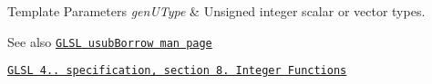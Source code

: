 \begin{DoxyTemplParams}{Template Parameters}
{\em gen\+U\+Type} & Unsigned integer scalar or vector types.\\
\hline
\end{DoxyTemplParams}
\begin{DoxySeeAlso}{See also}
\href{http://www.opengl.org/sdk/docs/manglsl/xhtml/usubBorrow.xml}{\tt G\+L\+S\+L usub\+Borrow man page} 

\href{http://www.opengl.org/registry/doc/GLSLangSpec.4.20.8.pdf}{\tt G\+L\+S\+L 4.. specification, section 8. Integer Functions} 
\end{DoxySeeAlso}
